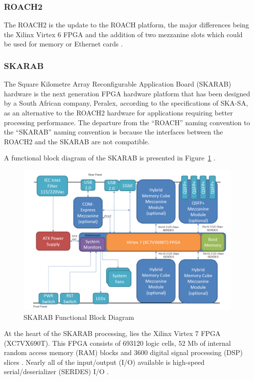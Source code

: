 \documentclass{ws-jai}
\begin{document}

\subsubsection{ROACH2}

The ROACH2 is the update to the ROACH platform, the major differences being the Xilinx Virtex 6 FPGA and the addition of two mezzanine slots which could be used for memory or Ethernet cards \cite{Casp12}.

\subsubsection{SKARAB}

The Square Kilometre Array Reconfigurable Application Board (SKARAB) hardware is the next generation FPGA hardware platform that has been designed by a South African company, Peralex, according to the specifications of SKA-SA, as an alternative to the ROACH2 hardware for applications requiring better processing performance. The departure from the ``ROACH'' naming convention to the ``SKARAB'' naming convention is because the interfaces between the ROACH2 and the SKARAB are not compatible.

A functional block diagram of the SKARAB is presented in Figure~\ref{fig:skarab_bd} \cite{cliff16}.

\begin{figure}[h]
\centering
\includegraphics[width=150mm, scale=0.5]{skarab_bd}
\caption{SKARAB Functional Block Diagram}
\label{fig:skarab_bd}
\end{figure}

At the heart of the SKARAB processing, lies the Xilinx Virtex 7 FPGA (XC7VX690T). This FPGA consists of 693120 logic cells, 52 Mb of internal random access memory (RAM) blocks and 3600 digital signal processing (DSP) slices \cite{cliff16}. Nearly all of the input/output (I/O) available is high-speed serial/deserializer (SERDES) I/O \cite{Teag15}. 
\end{document}

